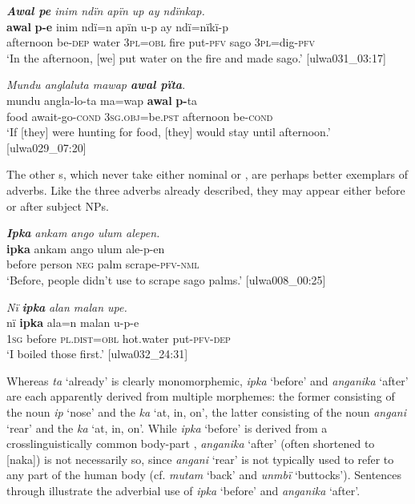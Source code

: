 \ea%
    \label{ex:otherwc:57}
          \textit{\textbf{Awal pe} inim ndïn apïn up ay ndïnkap.}\\
\gll    \textbf{awal}    \textbf{p-e}    inim  ndï=n    apïn  u-p      ay ndï=nïkï-p\\
    afternoon  be\textsc{{}-dep} water  3\textsc{pl=obl}  fire    put-\textsc{pfv}  sago    3\textsc{pl}=dig{}-\textsc{pfv}\\
\glt `In the afternoon, [we] put water on the fire and made sago.’ [ulwa031\_03:17]
\z

\ea%
    \label{ex:otherwc:58}
          \textit{Mundu anglaluta mawap \textbf{awal pïta}}.\\
\gll mundu  angla-lo-ta      ma=wap      \textbf{awal}    \textbf{p-}ta\\
    food  await-go-\textsc{cond}  \textsc{3sg.obj}=be.\textsc{pst}  afternoon  be\textsc{{}-cond}\\
\glt `If [they] were hunting for food, [they] would stay until afternoon.’ [ulwa029\_07:20]
\z

  The other s, which never take either nominal or , are perhaps better exemplars of adverbs. Like the three adverbs already described, they may appear either before  or after  subject NPs.

  \ea%
    \label{ex:otherwc:59}
          \textbf{\textit{Ipka}} \textit{ankam ango ulum alepen.}\\
\gll    \textbf{ipka}  ankam  ango  ulum   ale-p-en\\
    before  person  \textsc{neg}  palm  scrape-\textsc{pfv-nml}\\
\glt `Before, people didn’t use to scrape sago palms.’ [ulwa008\_00:25]
\z

\ea%
    \label{ex:otherwc:60}
          \textit{Nï} \textbf{\textit{ipka}} \textit{alan malan upe.}\\
\gll nï    \textbf{ipka}  ala=n      malan    u-p-e\\
    1\textsc{sg}  before  \textsc{pl.dist=obl}  hot.water  put-\textsc{pfv-dep}\\
\glt `I boiled those first.’ [ulwa032\_24:31]
\z



  Whereas \textit{ta} ‘already’ is clearly monomorphemic, \textit{ipka} ‘before’ and \textit{anganika} ‘after’ are each apparently derived from multiple morphemes: the former consisting of the noun \textit{ip} ‘nose’ and the  \textit{ka} ‘at, in, on’, the latter consisting of the noun \textit{angani} ‘rear’ and the  \textit{ka} ‘at, in, on’. While \textit{ipka} ‘before’ is derived from a crosslinguistically common body-part , \mbox{\textit{anganika}} ‘after’ (often shortened to [naka]) is not necessarily so, since \textit{angani} ‘rear’ is not typically used to refer to any part of the human body (cf. \textit{mutam} ‘back’ and \textit{unmbï} ‘buttocks’). Sentences  through  illustrate the adverbial use of \textit{ipka} ‘before’ and \textit{anganika} ‘after’.

